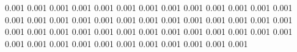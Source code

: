 0.001      0.001      %
0.001      0.001      %
0.001      0.001      %
0.001      0.001      %
0.001      0.001      %
0.001      0.001      %
0.001      0.001      %
0.001      0.001      %
0.001      0.001      %
0.001      0.001      %
0.001      0.001      %
0.001      0.001      %
0.001      0.001      %
0.001      0.001      %
0.001      0.001      %
0.001      0.001      %
0.001      0.001      %
0.001      0.001      %
0.001      0.001      %
0.001      0.001      %
0.001      0.001      %
0.001      0.001      %
0.001      0.001      %
0.001      0.001      %
0.001      0.001      %
